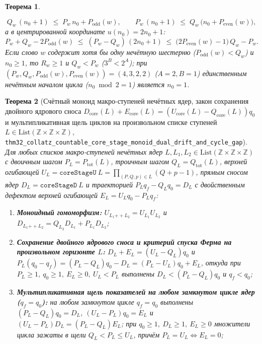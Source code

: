 \documentclass[11pt,a4paper]{article}
\newtheorem{theorem}{Теорема}[section]
\theoremstyle{definition}
\theoremstyle{remark}
\begin{document}
\begin{theorem}
\begin{enumerate}[label=\textbf{(\roman*)},leftmargin=*,noitemsep]
\begin{equation}
    Q_w\,(n_0 + 1) \;\le\; P_w\,n_0 + P_{\mathrm{odd}}(w), \qquad
    P_w\,(n_0 + 1) \;\le\; Q_w\,\bigl(n_0 + P_{\mathrm{even}}(w)\bigr),
  \end{equation}
  а в центрированной координате $u(n_0) = 2 n_0 + 1$:
  \[
    P_w + Q_w - 2 P_{\mathrm{odd}}(w) \;\le\; (P_w - Q_w)\,(2 n_0 + 1) \;\le\; \bigl(2 P_{\mathrm{even}}(w) - 1\bigr)\,Q_w - P_w.
  \]
  Если слово $w$ содержит хотя бы одну нечётную шестерню ($P_{\mathrm{odd}}(w) < Q_w$) и $n_0 \ge 1$, то $R_w \ge 1$ и $Q_w < P_w$ ($3^B < 2^A$); при $(P_w, Q_w, P_{\mathrm{odd}}(w), P_{\mathrm{even}}(w)) = (4, 3, 2, 2)$ ($A=2, B=1$) единственным нечётным началом цикла ($n_0 \bmod 2 = 1$) является $n_0 = 1$.
\end{enumerate}
\end{theorem}

\begin{theorem}[Счётный моноид макро-ступеней нечётных ядер, закон сохранения двойного ядрового сноса $D_{\mathrm{core}}(L) + E_{\mathrm{core}}(L) = (U_{\mathrm{core}}(L) - Q_{\mathrm{core}}(L))q_0$ и мультипликативная щель циклов на произвольном списке ступеней $L \in \mathrm{List}(\mathbb{Z}\times\mathbb{Z}\times\mathbb{Z})$, \texttt{thm32\_collatz\_countable\_core\_stage\_monoid\_dual\_drift\_and\_cycle\_gap}]
\label{thm:countable-core-stage-monoid}
Для любых списков макро-ступеней нечётных ядер $L,L_1,L_2 \in \mathrm{List}(\mathbb{Z}\times\mathbb{Z}\times\mathbb{Z})$ с двоичным шагом $P_L = P_{\mathrm{tot}}(L)$, троичным шагом $Q_L = Q_{\mathrm{tot}}(L)$, верхней огибающей $U_L = \texttt{coreStageU}\ L = \prod_{(P,Q,p)\in L}(Q+p-1)$, прямым сносом ядер $D_L = \texttt{coreStageD}\ L$ и траекторией $P_L q_f - Q_L q_0 = D_L$ с двойственным дефектом верхней огибающей $E_L = U_L q_0 - P_L q_f$:
\begin{enumerate}[label=\textbf{(\roman*)},leftmargin=*,noitemsep]
\item \textbf{Моноидный гомоморфизм:} $U_{L_1\mathbin{++}L_2} = U_{L_1}U_{L_2}$ и $D_{L_1\mathbin{++}L_2} = Q_{L_2}D_{L_1} + P_{L_1}D_{L_2}$;
\item \textbf{Сохранение двойного ядрового сноса и критерий спуска Ферма на произвольном горизонте $L$:}
  $D_L + E_L = (U_L - Q_L)q_0$ и $P_L(q_0 - q_f) = (P_L - Q_L)q_0 - D_L = (P_L - U_L)q_0 + E_L$, откуда при $P_L \ge 1,\ q_0 \ge 1,\ E_L \ge 0,\ U_L < P_L$ выполнены $D_L < (P_L - Q_L)q_0$ и $q_f < q_0$;
\item \textbf{Мультипликативная щель показателей на любом замкнутом цикле ядер ($q_f = q_0$):}
  на любом замкнутом цикле $q_f = q_0$ выполнены $(P_L - Q_L)q_0 = D_L$, $(U_L - P_L)q_0 = E_L$ и $(U_L - P_L)D_L = (P_L - Q_L)E_L$; при $q_0 \ge 1,\ D_L \ge 1,\ E_L \ge 0$ множители цикла зажаты в щели $Q_L < P_L \le U_L$, причём $P_L = U_L \iff E_L = 0$;

\end{enumerate}
\end{theorem}
\end{document}
